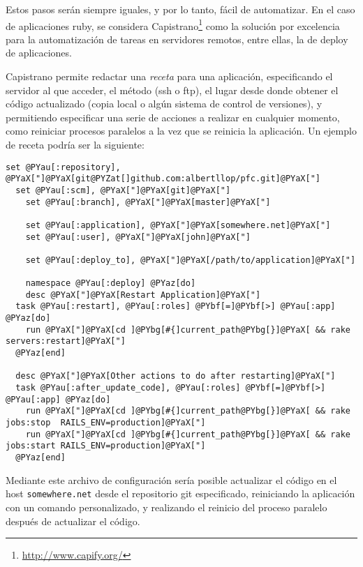 Estos pasos serán siempre iguales, y por lo tanto, fácil de automatizar. En el caso de aplicaciones ruby, se considera Capistrano\footnote{\url{http://www.capify.org/}} como la solución por excelencia para la automatización de tareas en servidores remotos, entre ellas, la de deploy de aplicaciones.

Capistrano permite redactar una \emph{receta} para una aplicación, especificando el servidor al que acceder, el método (ssh o ftp), el lugar desde donde obtener el código actualizado (copia local o algún sistema de control de versiones), y permitiendo especificar una serie de acciones a realizar en cualquier momento, como reiniciar procesos paralelos a la vez que se reinicia la aplicación. Un ejemplo de receta podría ser la siguiente:

%	
%	
%	
%  

\begin{Verbatim}[commandchars=@\[\]]
  set @PYau[:repository],  @PYaX["]@PYaX[git@PYZat[]github.com:albertllop/pfc.git]@PYaX["]
  set @PYau[:scm], @PYaX["]@PYaX[git]@PYaX["]
	set @PYau[:branch], @PYaX["]@PYaX[master]@PYaX["]
	
	set @PYau[:application], @PYaX["]@PYaX[somewhere.net]@PYaX["]
	set @PYau[:user], @PYaX["]@PYaX[john]@PYaX["]
	
	set @PYau[:deploy_to], @PYaX["]@PYaX[/path/to/application]@PYaX["]
	
	namespace @PYau[:deploy] @PYaz[do]
	desc @PYaX["]@PYaX[Restart Application]@PYaX["]
  task @PYau[:restart], @PYau[:roles] @PYbf[=]@PYbf[>] @PYau[:app] @PYaz[do]
    run @PYaX["]@PYaX[cd ]@PYbg[#{]current_path@PYbg[}]@PYaX[ && rake servers:restart]@PYaX["]
  @PYaz[end]
  
  desc @PYaX["]@PYaX[Other actions to do after restarting]@PYaX["]
  task @PYau[:after_update_code], @PYau[:roles] @PYbf[=]@PYbf[>] @PYau[:app] @PYaz[do]
    run @PYaX["]@PYaX[cd ]@PYbg[#{]current_path@PYbg[}]@PYaX[ && rake jobs:stop  RAILS_ENV=production]@PYaX["]
    run @PYaX["]@PYaX[cd ]@PYbg[#{]current_path@PYbg[}]@PYaX[ && rake jobs:start RAILS_ENV=production]@PYaX["]
  @PYaz[end]
\end{Verbatim}


Mediante este archivo de configuración sería posible actualizar el código en el host \texttt{somewhere.net} desde el repositorio git especificado, reiniciando la aplicación con un comando personalizado, y realizando el reinicio del proceso paralelo después de actualizar el código.

